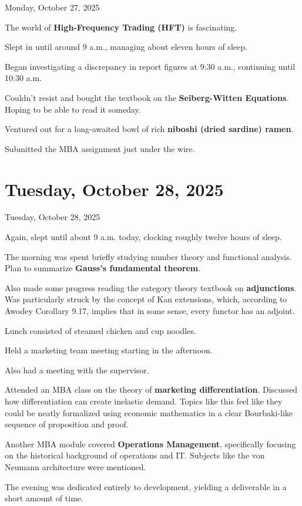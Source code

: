 \documentclass[dvipdfmx, autodetect-engine, aspectratio=169, 10.5pt]{beamer}
\begin{document}
\begin{frame}{Monday, October 27, 2025}

The world of \textbf{High-Frequency Trading (HFT)} is fascinating.

Slept in until around 9 a.m., managing about eleven hours of sleep.

Began investigating a discrepancy in report figures at 9:30 a.m., continuing until 10:30 a.m.

Couldn't resist and bought the textbook on the \textbf{Seiberg-Witten Equations}. Hoping to be able to read it someday.

Ventured out for a long-awaited bowl of rich \textbf{niboshi (dried sardine) ramen}.

Submitted the MBA assignment just under the wire.
\end{frame}

\section{Tuesday, October 28, 2025}

\begin{frame}{Tuesday, October 28, 2025}

Again, slept until about 9 a.m. today, clocking roughly twelve hours of sleep.

The morning was spent briefly studying number theory and functional analysis. Plan to summarize \textbf{Gauss's fundamental theorem}.

Also made some progress reading the category theory textbook on \textbf{adjunctions}. Was particularly struck by the concept of Kan extensions, which, according to Awodey Corollary 9.17, implies that in some sense, every functor has an adjoint.

Lunch consisted of steamed chicken and cup noodles.

Held a marketing team meeting starting in the afternoon.

Also had a meeting with the supervisor.

Attended an MBA class on the theory of \textbf{marketing differentiation}. Discussed how differentiation can create inelastic demand. Topics like this feel like they could be neatly formalized using economic mathematics in a clear Bourbaki-like sequence of proposition and proof.

Another MBA module covered \textbf{Operations Management}, specifically focusing on the historical background of operations and IT. Subjects like the von Neumann architecture were mentioned.

The evening was dedicated entirely to development, yielding a deliverable in a short amount of time.
\end{frame}
\end{document}
